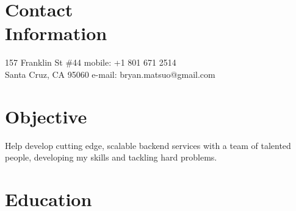 \documentclass[margin,line]{resume}
\begin{document}
\begin{resume}

    \section{\mysidestyle Contact\\Information}

    157 Franklin St \#44            \hfill mobile: +1 801 671 2514         \vspace{0mm}\\\vspace{0mm}%
    Santa Cruz, CA 95060            \hfill e-mail: bryan.matsuo@gmail.com   \vspace{0mm}\\\vspace{-4.5mm}%


    \section{\mysidestyle Objective}

    Help develop cutting edge, scalable backend services with a team of talented people, developing my skills and
    tackling hard problems.


    \section{\mysidestyle Education}


\end{resume}
\end{document}
